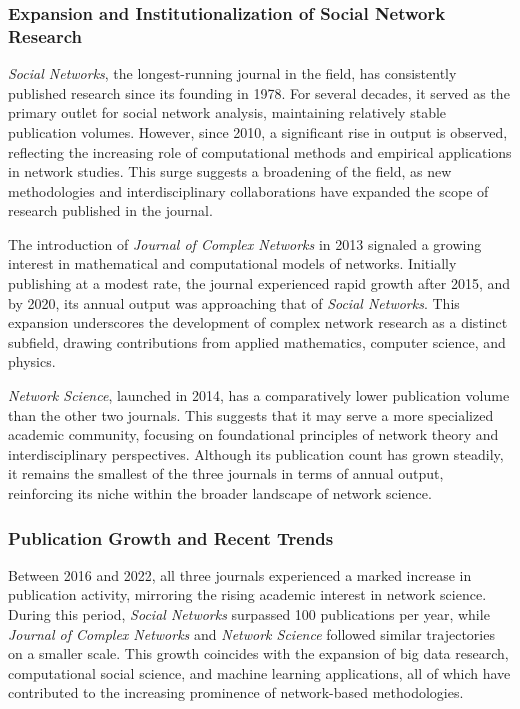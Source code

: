 \documentclass[twocolumn]{article}
\begin{document}
	\subsubsection*{Expansion and Institutionalization of Social Network Research}
	
	\textit{Social Networks}, the longest-running journal in the field, has consistently published research since its founding in 1978. For several decades, it served as the primary outlet for social network analysis, maintaining relatively stable publication volumes. However, since 2010, a significant rise in output is observed, reflecting the increasing role of computational methods and empirical applications in network studies. This surge suggests a broadening of the field, as new methodologies and interdisciplinary collaborations have expanded the scope of research published in the journal.
	
	The introduction of \textit{Journal of Complex Networks} in 2013 signaled a growing interest in mathematical and computational models of networks. Initially publishing at a modest rate, the journal experienced rapid growth after 2015, and by 2020, its annual output was approaching that of \textit{Social Networks}. This expansion underscores the development of complex network research as a distinct subfield, drawing contributions from applied mathematics, computer science, and physics.
	
	\textit{Network Science}, launched in 2014, has a comparatively lower publication volume than the other two journals. This suggests that it may serve a more specialized academic community, focusing on foundational principles of network theory and interdisciplinary perspectives. Although its publication count has grown steadily, it remains the smallest of the three journals in terms of annual output, reinforcing its niche within the broader landscape of network science.
	
	\subsubsection*{Publication Growth and Recent Trends}
	
	Between 2016 and 2022, all three journals experienced a marked increase in publication activity, mirroring the rising academic interest in network science. During this period, \textit{Social Networks} surpassed 100 publications per year, while \textit{Journal of Complex Networks} and \textit{Network Science} followed similar trajectories on a smaller scale. This growth coincides with the expansion of big data research, computational social science, and machine learning applications, all of which have contributed to the increasing prominence of network-based methodologies.
	
\end{document}
